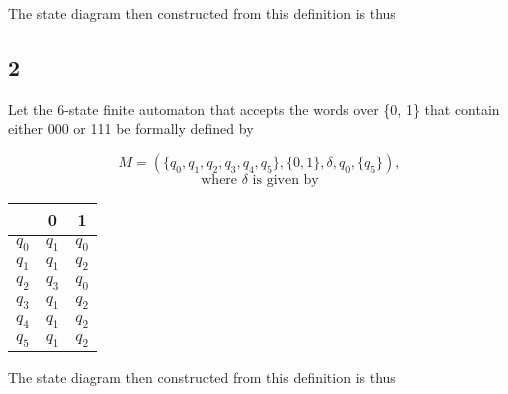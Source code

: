 \documentclass{article}
\begin{document}
The state diagram then constructed from this definition is thus

\begin{center}
\end{center}

\subsection{2}

Let the 6-state finite automaton that accepts the words over \{0, 1\} that contain either 000 or 111 be formally defined by

\[
M = \left(\{q_0, q_1, q_2, q_3, q_4, q_5\}, \{0,
1\}, \delta, q_0, \{q_5\} \right),
\]
\[\textrm{where } \delta \textrm{ is given by} \] 
\begin{center}
    \begin{tabular}{c|cc}
    & \textrm{0} & \textrm{1}\\ \hline
    $q_0$ & $q_1$ & $q_0$ \\
    $q_1$ & $q_1$ & $q_2$ \\
    $q_2$ & $q_3$ & $q_0$ \\
    $q_3$ & $q_1$ & $q_2$ \\
    $q_4$ & $q_1$ & $q_2$ \\
    $q_5$ & $q_1$ & $q_2$
    \end{tabular}
\end{center}

The state diagram then constructed from this definition is thus
\end{document}
